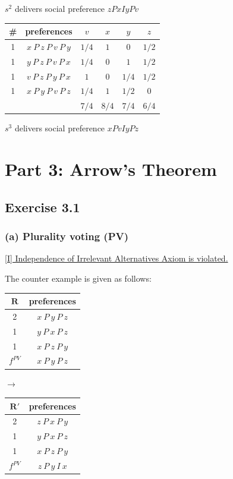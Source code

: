 \documentclass[a4paper]{article}
\begin{document}
$s^2$ delivers social preference $zPxIyPv$

\begin{table}[!htbp]
    \centering
    \begin{tabular}{c|c|cccc|}
        \# & preferences                  & $v$  & $x$  & $y$  & $z$ \\ 
        \hline
        1  & $x\: P\: z\: P\: v\: P\: y$  & $1/4$  & $1$  & $0$  & $1/2$ \\
        1  & $y\: P\: z\: P\: v\: P\: x$  & $1/4$  & $0$  & $1$  & $1/2$ \\
        1  & $v\: P\: z\: P\: y\: P\: x$  & $1$  & $0$  & $1/4$  & $1/2$ \\
        1  & $x\: P\: y\: P\: v\: P\: z$  & $1/4$  & $1$  & $1/2$  & $0$ \\
        \hline
           &                              & $7/4$ & $8/4$  & $7/4$  & $6/4$ \\
        \hline
    \end{tabular}
\end{table}

$s^3$ delivers social preference $xPvIyPz$

\section*{Part 3: Arrow's Theorem}

\subsection*{Exercise 3.1}

\subsubsection*{(a) Plurality voting (PV)}

\underline{[I] Independence of Irrelevant Alternatives Axiom is violated. }

The counter example is given as follows:

\begin{table}[!htbp]
    \centering
    \begin{tabular}{c|c|}
        $\mathbf{R}$ & preferences         \\ 
        \hline
        2  & $x\: P\: y\: P\: z$ \\
        1  & $y\: P\: x\: P\: z$ \\
        1  & $x\: P\: z\: P\: y$ \\
        \hline 
        $f^{PV}$ & $x\: P\: y\: P\: z$
    \end{tabular}
    \qquad $\to$ \qquad
    \centering
    \begin{tabular}{c|c|}
        $\mathbf{R'}$ & preferences         \\ 
        \hline
        2  & $z\: P\: x\: P\: y$ \\
        1  & $y\: P\: x\: P\: z$ \\
        1  & $x\: P\: z\: P\: y$ \\
        \hline 
        $f^{PV}$ & $z\: P\: y\: I\: x$
    \end{tabular}
\end{table}
\end{document}
